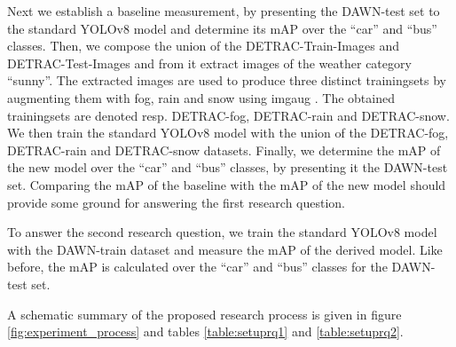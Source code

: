 \documentclass[]{article}
\begin{document}
	Next we establish a baseline measurement, by presenting the DAWN-test set to the standard YOLO{\small v8} model and determine its mAP over the ``car'' and ``bus'' classes. Then, we compose the union of the DETRAC-Train-Images and DETRAC-Test-Images and from it extract images of the weather category ``sunny''. The extracted images are used to produce three distinct trainingsets by augmenting them with fog, rain and snow using imgaug \cite{imgaug}. The obtained trainingsets are denoted resp. DETRAC-fog, DETRAC-rain and DETRAC-snow. We then train the standard YOLO{\small v8} model with the union of the DETRAC-fog, DETRAC-rain and DETRAC-snow datasets. Finally, we determine the mAP of the new model over the  ``car'' and ``bus'' classes, by presenting it the DAWN-test set. Comparing the mAP of the baseline with the mAP of the new model should provide some ground for answering the first research question.

	To answer the second research question, we train the standard YOLO{\small v8} model with the DAWN-train dataset and measure the mAP of the derived model. Like before, the mAP is calculated over the ``car'' and ``bus'' classes for the DAWN-test set.
	
	A schematic summary of the proposed research process is given in figure \ref{fig:experiment_process} and tables \ref{table:setuprq1} and \ref{table:setuprq2}.
	
\end{document}
